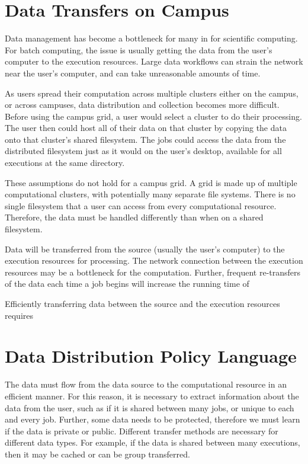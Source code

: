 




\section{Data Transfers on Campus}

Data management has become a bottleneck for many in for scientific computing.  For batch computing, the issue is usually getting the data from the user's computer to the execution resources.  Large data workflows can strain the network near the user's computer, and can take unreasonable amounts of time.

As users spread their computation across multiple clusters either on the campus, or across campuses, data distribution and collection becomes more difficult.  Before using the campus grid, a user would select a cluster to do their processing.  The user then could host all of their data on that cluster by copying the data onto that cluster's shared filesystem.  The jobs could access the data from the distributed filesystem just as it would on the user's desktop, available for all executions at the same directory.

These assumptions do not hold for a campus grid.  A grid is made up of multiple computational clusters, with potentially many separate file systems.  There is no single filesystem that a user can access from every computational resource.  Therefore, the data must be handled differently than when on a shared filesystem.  

Data will be transferred from the source (usually the user's computer) to the execution resources for processing.  The network connection between the execution resources may be a bottleneck for the computation.  Further, frequent re-transfers of the data each time a job begins will increase the running time of 

Efficiently transferring data between the source and the execution resources requires 


\section{Data Distribution Policy Language}
The data must flow from the data source to the computational resource in an efficient manner.  For this reason, it is necessary to extract information about the data from the user, such as if it is shared between many jobs, or unique to each and every job.  Further, some data needs to be protected, therefore we must learn if the data is private or public.  Different transfer methods are necessary for different data types.  For example, if the data is shared between many executions, then it may be cached or can be group transferred.  


